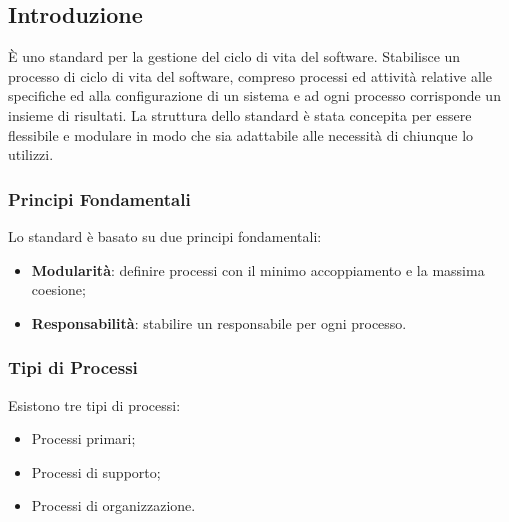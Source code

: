 \subsection{Introduzione}
È uno standard per la gestione del ciclo di vita del software. Stabilisce un processo di ciclo di vita del software, compreso processi ed attività relative alle specifiche ed alla configurazione di un sistema e ad ogni processo corrisponde un insieme di risultati.
La struttura dello standard è stata concepita per essere flessibile e modulare in modo che sia adattabile alle necessità di chiunque lo utilizzi.

\subsubsection{Principi Fondamentali}
Lo standard è basato su due principi fondamentali:
\begin{itemize}
	\item \textbf{Modularità}: definire processi con il minimo accoppiamento e la massima coesione;
	\item \textbf{Responsabilità}: stabilire un responsabile per ogni processo.
\end{itemize}

\subsubsection{Tipi di Processi}
Esistono tre tipi di processi:
\begin{itemize}
	\item Processi primari;
	\item Processi di supporto;
	\item Processi di organizzazione.
\end{itemize}